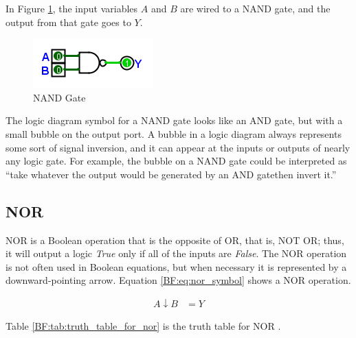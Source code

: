 In Figure \ref{fig:04_05}, the input variables $ A $ and $ B $ are wired to a NAND gate, and the output from that gate goes to $ Y $.

\begin{figure}[H]
	\centering
	\includegraphics[width=\maxwidth{.95\linewidth}]{gfx/04_05}
	\caption{NAND Gate}
	\label{fig:04_05}
\end{figure}


The logic diagram symbol for a \textsf{NAND}  gate looks like an \textsf{AND} gate, but with a small bubble on the output port. A bubble in a logic diagram always represents some sort of signal inversion, and it can appear at the inputs or outputs of nearly any logic gate. For example, the bubble on a \textsf{NAND}  gate could be interpreted as ``take whatever the output would be generated by an \textsf{AND} gate\textemdash then invert it.'' 

\subsection{NOR}
\label{BF:subsec:nor}

\textsf{NOR}  is a Boolean operation that is the opposite of OR, that is, \textsf{NOT OR}; thus, it will output a logic \emph{True} only if all of the inputs are \emph{False}. The \textsf{NOR} operation is not often used in Boolean equations, but when necessary it is represented by a downward-pointing arrow. Equation \ref{BF:eq:nor_symbol} shows a \textsf{NOR} operation.

\begin{align}
  \label{BF:eq:nor_symbol}
  A \downarrow B &= Y 
\end{align}

Table \ref{BF:tab:truth_table_for_nor} is the truth table for \textsf{NOR} . 

